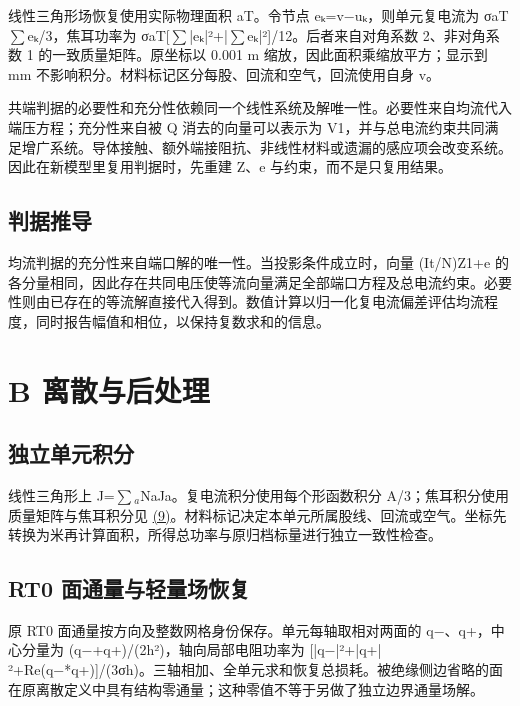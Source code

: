 \documentclass[11pt]{article}
\begin{document}
线性三角形场恢复使用实际物理面积 aT。令节点 eₖ=v−uₖ，则单元复电流为 σaT\(\sum\)eₖ/3，焦耳功率为 σaT[\(\sum\)|eₖ|²+|\(\sum\)eₖ|²]/12。后者来自对角系数 2、非对角系数 1 的一致质量矩阵。原坐标以 0.001 m 缩放，因此面积乘缩放平方；显示到 mm 不影响积分。材料标记区分每股、回流和空气，回流使用自身 v。


共端判据的必要性和充分性依赖同一个线性系统及解唯一性。必要性来自均流代入端压方程；充分性来自被 Q 消去的向量可以表示为 V1，并与总电流约束共同满足增广系统。导体接触、额外端接阻抗、非线性材料或遗漏的感应项会改变系统。因此在新模型里复用判据时，先重建 Z、e 与约束，而不是只复用结果。


\subsection*{判据推导}
\hypertarget{A.sharing_derivation.heading}{}
均流判据的充分性来自端口解的唯一性。当投影条件成立时，向量 (It/N)Z1+e 的各分量相同，因此存在共同电压使等流向量满足全部端口方程及总电流约束。必要性则由已存在的等流解直接代入得到。数值计算以归一化复电流偏差评估均流程度，同时报告幅值和相位，以保持复数求和的信息。


\FloatBarrier
\section*{B 离散与后处理}
\hypertarget{chapter-B}{}
\subsection*{独立单元积分}
\hypertarget{B.triangle_derivation.heading}{}
线性三角形上 J=\(\sum\)\(_a\)NaJa。复电流积分使用每个形函数积分 A/3；焦耳积分使用质量矩阵与焦耳积分见 \href{report_zh-CN_single.pdf#E09}{(9)}。材料标记决定本单元所属股线、回流或空气。坐标先转换为米再计算面积，所得总功率与原归档标量进行独立一致性检查。


\subsection*{RT0 面通量与轻量场恢复}
\hypertarget{B.report_rt0.heading}{}
原 RT0 面通量按方向及整数网格身份保存。单元每轴取相对两面的 q−、q+，中心分量为 (q−+q+)/(2h²)，轴向局部电阻功率为 [|q−|²+|q+|²+Re(q−*q+)]/(3σh)。三轴相加、全单元求和恢复总损耗。被绝缘侧边省略的面在原离散定义中具有结构零通量；这种零值不等于另做了独立边界通量场解。
\end{document}
